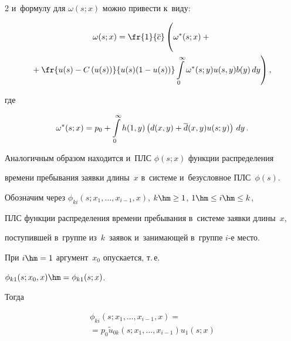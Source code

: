 \begin{multicols}{2}
и~формулу для $\omega(s;x)$ можно привести к~виду:


\begin{multline}


\omega(s;x)


= \fr{1}{\overline{c}}


\left (


\vphantom{\int\limits_{0}^\infty}


\omega^*(s;x) + {}\right.\\


\hspace*{-2mm}\left.{}+\fr{u(s)-C \left ( u(s) \right )}{u(s) (1- u(s))}


\int\limits_{0}^\infty \omega^*(s;y) u(s,y) b(y)\, dy \right ),\!


\label{sc1}


\end{multline}





\noindent где


$$


\omega^*(s;x)= p_0 + \int\limits_0^\infty


h(1,y) \left ( d(x,y) + \d(x,y) u(s;y)


\right ) \,dy\,.


$$





Аналогичным образом находится и~ПЛС $\phi(s;x)$ функции распределения


времени пребывания заявки длины~$x$ в~системе и~безусловное ПЛС~$\phi(s)$.


Обозначим через $\phi_{ki}(s;x_1, \dots, x_{i-1},x)$, $k \hm\ge 1$, $1\hm\le i \hm\le k$,


ПЛС функции распределения времени пребывания в~системе заявки длины~$x$,


поступившей в~группе из~$k$~заявок и~занимающей в~группе $i$-е место.


При $i\hm=1$ аргумент~$x_0$ опускается, т.\,е.\


 $\phi_{k1}(s;x_{0},x)\hm=\phi_{k1}(s;x)$.


Тогда


\begin{multline*}


\phi_{ki}(s;x_1, \dots, x_{i-1},x)


={}\\


{}=p_0 {\tilde u}_{0k}\left(s;x_1,\dots,x_{i-1}\right)u_{1}(s;x)



\end{multline*}
\end{multicols}
